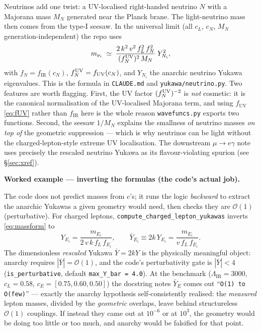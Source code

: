 \documentclass[11pt]{article}
\newenvironment{callout}[1]{%
  \par\medskip\begin{shaded}\noindent\textbf{#1}\par\smallskip}{\end{shaded}\medskip}
\newcommand{\LIR}{\Lambda_{\mathrm{IR}}}
\newcommand{\vev}{v}
\newcommand{\fIR}{f_{\mathrm{IR}}}
\newcommand{\fUV}{f_{\mathrm{UV}}}
\newcommand{\code}[1]{\texttt{#1}}
\theoremstyle{definition}
\begin{document}
Neutrinos add one twist: a UV-localised right-handed neutrino $N$ with a Majorana
mass $M_N$ generated near the Planck brane. The light-neutrino mass then comes from
the type-I seesaw. In the universal limit (all $c_L$, $c_N$, $M_N$
generation-independent) the repo uses
\begin{equation}
m_{\nu_i} \;\simeq\; \frac{2\,k^2\,\vev^2\,f_L^2\,f_N^2}{(f_N^{\rm UV})^2\,M_N}\;Y_{N_i}^2,
\label{eq:seesaw}
\end{equation}
with $f_N=\fIR(c_N)$, $f_N^{\rm UV}=\fUV(c_N)$, and $Y_{N_i}$ the anarchic neutrino
Yukawa eigenvalues. This is the formula in \code{CLAUDE.md} and
\code{yukawa/neutrino.py}. Two features are worth flagging. First, the UV factor
$(f_N^{\rm UV})^{-2}$ is \emph{not} cosmetic: it is the canonical normalisation of
the UV-localised Majorana term, and using $\fUV$ \eqref{eq:fUV} rather than $\fIR$
here is the whole reason \code{wavefuncs.py} exports two functions. Second, the
seesaw $1/M_N$ explains the smallness of neutrino masses \emph{on top of} the
geometric suppression --- which is why neutrinos can be light without the
charged-lepton-style extreme UV localisation. The downstream $\mu\to e\gamma$ note
uses precisely the rescaled neutrino Yukawa as its flavour-violating spurion (see
\S\ref{sec:xref}).

\begin{callout}{Worked example --- inverting the formulas (the code's actual job).}
The code does not predict masses from $c$'s; it runs the logic \emph{backward} to
extract the anarchic Yukawas a given geometry would need, then checks they are
$\mathcal{O}(1)$ (perturbative). For charged leptons,
\code{compute\_charged\_lepton\_yukawas} inverts \eqref{eq:massform} to
\[
Y_{E_i} = \frac{m_{E_i}}{2\,\vev\,k\,f_L\,f_{E_i}},
\qquad
\bar{Y}_{E_i} \equiv 2k\,Y_{E_i} = \frac{m_{E_i}}{\vev\,f_L\,f_{E_i}}.
\]
The dimensionless \emph{rescaled} Yukawa $\bar Y=2kY$ is the physically meaningful
object: anarchy requires $|\bar Y|=\mathcal{O}(1)$, and the code's perturbativity
gate is $|\bar Y|<4$ (\code{is\_perturbative}, default \code{max\_Y\_bar = 4.0}).
At the benchmark ($\LIR=3000$, $c_L=0.58$, $c_E=[0.75,0.60,0.50]$) the docstring
notes $\bar Y_E$ comes out ``\code{O(1) to O(few)}'' --- exactly the anarchy
hypothesis self-consistently realised: the \emph{measured} lepton masses, divided
by the \emph{geometric} overlaps, leave behind structureless $\mathcal{O}(1)$
couplings. If instead they came out at $10^{-6}$ or at $10^3$, the geometry would
be doing too little or too much, and anarchy would be falsified for that point.
\end{callout}
\end{document}
